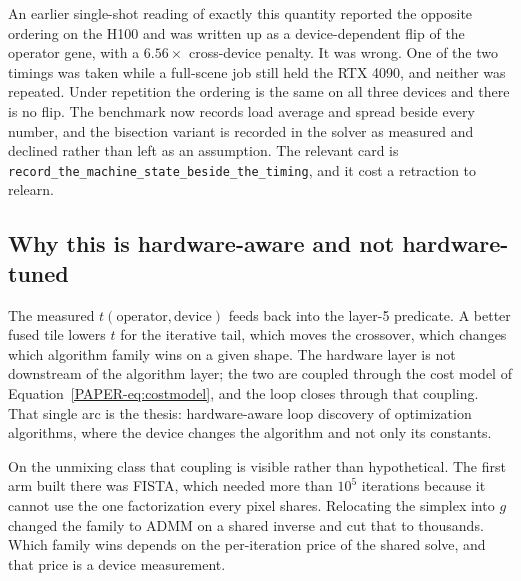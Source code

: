 \documentclass[11pt]{article}
\begin{document}
An earlier single-shot reading of exactly this quantity reported the opposite
ordering on the H100 and was written up as a device-dependent flip of the
operator gene, with a $6.56\times$ cross-device penalty. It was wrong. One of
the two timings was taken while a full-scene job still held the RTX 4090, and
neither was repeated. Under repetition the ordering is the same on all three
devices and there is no flip. The benchmark now records load average and
spread beside every number, and the bisection variant is recorded in the
solver as measured and declined rather than left as an assumption. The
relevant card is \texttt{record\_the\_machine\_state\_beside\_the\_timing},
and it cost a retraction to relearn.

\subsection{Why this is hardware-aware and not hardware-tuned}

The measured $t(\text{operator},\text{device})$ feeds back into the layer-5
predicate. A better fused tile lowers $t$ for the iterative tail, which moves
the crossover, which changes which algorithm family wins on a given shape. The
hardware layer is not downstream of the algorithm layer; the two are coupled
through the cost model of Equation~\ref{PAPER-eq:costmodel}, and the loop
closes through that coupling. That single arc is the thesis: hardware-aware
loop discovery of optimization algorithms, where the device changes the
algorithm and not only its constants.

On the unmixing class that coupling is visible rather than hypothetical. The
first arm built there was FISTA, which needed more than $10^5$ iterations
because it cannot use the one factorization every pixel shares. Relocating the
simplex into $g$ changed the family to ADMM on a shared inverse and cut that
to thousands. Which family wins depends on the per-iteration price of the
shared solve, and that price is a device measurement.




\end{document}
